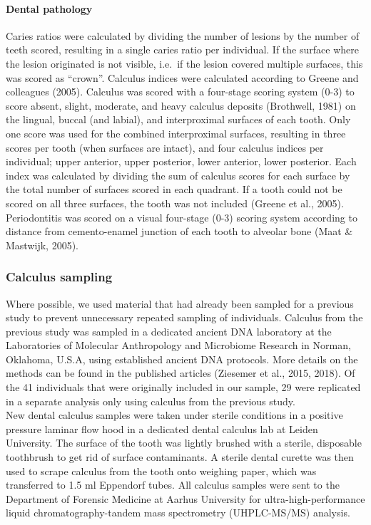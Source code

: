 \documentclass[
]{article}
\let\oldparagraph\paragraph
\renewcommand{\paragraph}[1]{\oldparagraph{#1}\mbox{}}
\begin{document}
\hypertarget{dental-pathology}{%
\paragraph{Dental pathology}\label{dental-pathology}}

Caries ratios were calculated by dividing the number of lesions by the
number of teeth scored, resulting in a single caries ratio per
individual. If the surface where the lesion originated is not visible,
i.e.~if the lesion covered multiple surfaces, this was scored as
``crown''. Calculus indices were calculated according to Greene and
colleagues (2005). Calculus was scored with a four-stage scoring system
(0-3) to score absent, slight, moderate, and heavy calculus deposits
(Brothwell, 1981) on the lingual, buccal (and labial), and interproximal
surfaces of each tooth. Only one score was used for the combined
interproximal surfaces, resulting in three scores per tooth (when
surfaces are intact), and four calculus indices per individual; upper
anterior, upper posterior, lower anterior, lower posterior. Each index
was calculated by dividing the sum of calculus scores for each surface
by the total number of surfaces scored in each quadrant. If a tooth
could not be scored on all three surfaces, the tooth was not included
(Greene et al., 2005). Periodontitis was scored on a visual four-stage
(0-3) scoring system according to distance from cemento-enamel junction
of each tooth to alveolar bone (Maat \& Mastwijk, 2005).

\hypertarget{calculus-sampling}{%
\subsubsection{Calculus sampling}\label{calculus-sampling}}

Where possible, we used material that had already been sampled for a
previous study to prevent unnecessary repeated sampling of individuals.
Calculus from the previous study was sampled in a dedicated ancient DNA
laboratory at the Laboratories of Molecular Anthropology and Microbiome
Research in Norman, Oklahoma, U.S.A, using established ancient DNA
protocols. More details on the methods can be found in the published
articles (Ziesemer et al., 2015, 2018). Of the 41 individuals that were
originally included in our sample, 29 were replicated in a separate
analysis only using calculus from the previous study.\\
New dental calculus samples were taken under sterile conditions in a
positive pressure laminar flow hood in a dedicated dental calculus lab
at Leiden University. The surface of the tooth was lightly brushed with
a sterile, disposable toothbrush to get rid of surface contaminants. A
sterile dental curette was then used to scrape calculus from the tooth
onto weighing paper, which was transferred to 1.5 ml Eppendorf tubes.
All calculus samples were sent to the Department of Forensic Medicine at
Aarhus University for ultra-high-performance liquid
chromatography-tandem mass spectrometry (UHPLC-MS/MS) analysis.
\end{document}
